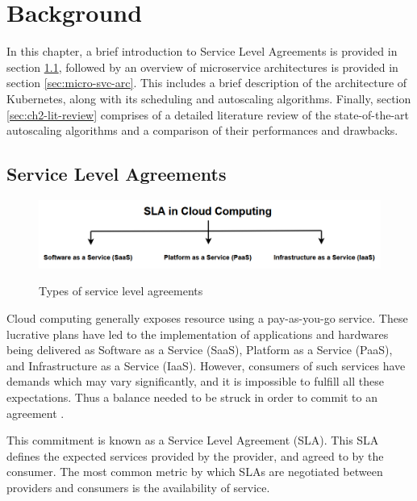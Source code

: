 \clearpage

\def\chaptertitle{Background}

\lhead{\emph{\chaptertitle}}

\chapter{\chaptertitle}
\label{ch:background}

In this chapter, a brief introduction to Service Level Agreements is provided in section \ref{sec:sla}, followed by an overview of microservice architectures is provided in section \ref{sec:micro-svc-arc}. This includes a brief description of the architecture of Kubernetes, along with its scheduling and autoscaling algorithms. Finally, section \ref{sec:ch2-lit-review} comprises of a detailed literature review of the state-of-the-art autoscaling algorithms and a comparison of their performances and drawbacks.

\section{Service Level Agreements}
\label{sec:sla}

\begin{figure}[htb]
    \centering
    \caption{Types of service level agreements}
    \includegraphics[width=0.9\linewidth]{Figures/SLA-Cloud-Computing.png}
    \label{fig:sla-types}
\end{figure}

Cloud computing generally exposes resource using a pay-as-you-go service. These lucrative plans have led to the implementation of applications and hardwares being delivered as Software as a Service (SaaS), Platform as a Service (PaaS), and Infrastructure as a Service (IaaS). However, consumers of such services have demands which may vary significantly, and it is impossible to fulfill all these expectations. Thus a balance needed to be struck in order to commit to an agreement \cite{patel2009service}. \par
This commitment is known as a Service Level Agreement (SLA). This SLA defines the expected services provided by the provider, and agreed to by the consumer. The most common metric by which SLAs are negotiated between providers and consumers is the availability of service.

